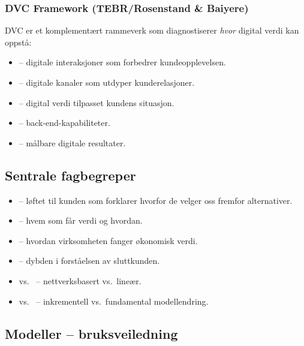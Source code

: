 \subsubsection*{DVC Framework (TEBR/Rosenstand \& Baiyere)}
DVC er et komplementært rammeverk som diagnostiserer \emph{hvor} digital verdi
kan oppstå:
\begin{itemize}
  \item {} -- digitale interaksjoner som forbedrer kundeopplevelsen.
  \item {} -- digitale kanaler som utdyper kunderelasjoner.
  \item {} -- digital verdi tilpasset kundens situasjon.
  \item {} -- back-end-kapabiliteter.
  \item {} -- målbare digitale resultater.
\end{itemize}

\subsection{Sentrale fagbegreper}\label{terms:lec03}
\begin{itemize}
  \item {} -- løftet til kunden som forklarer hvorfor de
    velger oss fremfor alternativer.
  \item {} -- hvem som får verdi og hvordan.
  \item {} -- hvordan virksomheten fanger økonomisk verdi.
  \item {} -- dybden i forståelsen av sluttkunden.
  \item {} vs.\  -- nettverksbasert vs.\ lineær.
  \item {} vs.\  -- inkrementell vs.\
    fundamental modellendring.
\end{itemize}

\subsection{Modeller -- bruksveiledning}

